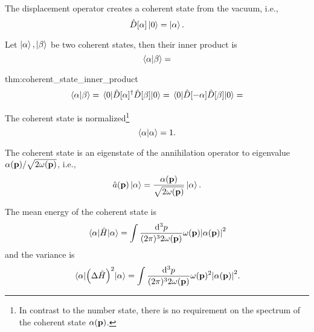 \begin{lemma}
	The displacement operator creates a coherent state from the vacuum, i.e.,
	\begin{equation}
		\hat{D}[\alpha]
		\ket{0}
		=
		\ket{\alpha}
		.
	\end{equation}
\end{lemma}
\begin{lemma}\label{thm:coherent_state_inner_product}
	Let $\ket{\alpha},\ket{\beta}$ be two coherent states, then their inner product is
	\begin{equation}
		\braket{\alpha}{\beta}
		=
	\end{equation}
\end{lemma}
\begin{delayedproof}{thm:coherent_state_inner_product}
	\begin{equation*}
		\begin{split}
			\braket{\alpha}{\beta}
			=
			\expval{
				\hat{D}[\alpha]^\dagger
				\hat{D}[\beta]
			}{0}
			=
			\expval{
				\hat{D}[-\alpha]
				\hat{D}[\beta]
			}{0}
			=
		\end{split}
	\end{equation*}
\end{delayedproof}
\begin{corollary}
	The coherent state is normalized\footnote{In contrast to the number state, there is no requirement on the spectrum of the coherent state $\alpha(\vb{p})$.}
	\begin{equation}
		\braket{\alpha}
		=
		1
		.
	\end{equation}
\end{corollary}
\begin{theorem}\label{thm:coherent_state_annihilation_eigenvalue}
	The coherent state is an eigenstate of the annihilation operator to eigenvalue $\alpha(\vb{p})/\sqrt{2\omega(\vb{p})}$, i.e.,
	\begin{equation}
		\hat{a}(\vb{p})
		\ket{\alpha}
		=
		\frac{\alpha(\vb{p})}{\sqrt{2\omega(\vb{p})}}
		\ket{\alpha}
		.
	\end{equation}
\end{theorem}
\begin{lemma}\label{thm:coherent_state_energy_observable}
	The mean energy of the coherent state is
	\begin{equation}
		\expval{\hat{H}}{\alpha}
		=
		\int\frac{\dd[3]{p}}{(2\pi)^32\omega(\vb{p})}
		\omega(\vb{p})
		\abs{\alpha(\vb{p})}^2
	\end{equation}
	and the variance is
	\begin{equation}
		\expval{\left(\Delta\hat{H}\right)^2}{\alpha}
		=
		\int\frac{\dd[3]{p}}{(2\pi)^32\omega(\vb{p})}
		\omega(\vb{p})^2
		\abs{\alpha(\vb{p})}^2
		.
	\end{equation}
\end{lemma}
